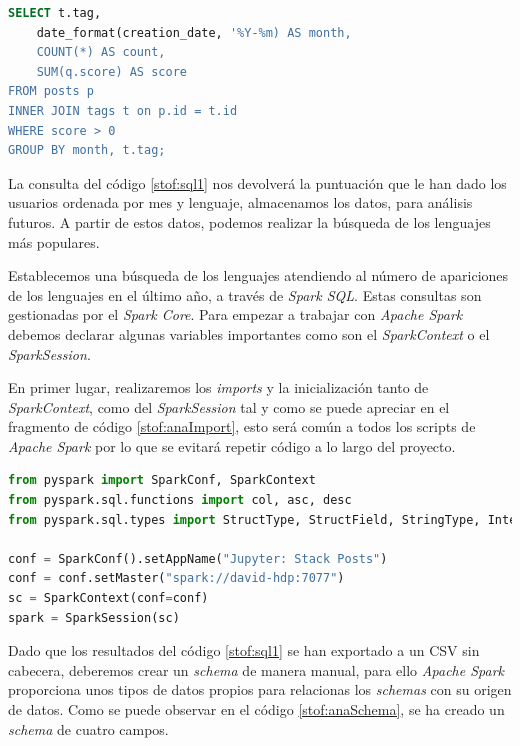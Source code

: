 \begin{lstlisting}[label=stof:sql1,language=sql,frame=single,caption={Consulta \gls{SQL} para la extraccion de la fecha, \textit{tag} y \textit{score} de las consultas en \textit{Stack Overflow}.}]
SELECT t.tag,
	date_format(creation_date, '%Y-%m) AS month,
	COUNT(*) AS count,
	SUM(q.score) AS score
FROM posts p
INNER JOIN tags t on p.id = t.id
WHERE score > 0
GROUP BY month, t.tag;
\end{lstlisting}

La consulta del código \ref{stof:sql1} nos devolverá la puntuación que le han dado los usuarios ordenada por mes y lenguaje, almacenamos los datos, para análisis futuros. A partir de estos datos, podemos realizar la búsqueda de los lenguajes más populares.

Establecemos una búsqueda de los lenguajes atendiendo al número de apariciones de los lenguajes en el último año, a través de \textit{Spark SQL}.
Estas consultas son gestionadas por el \textit{Spark Core}. Para empezar a trabajar con \textit{Apache Spark} debemos declarar algunas variables importantes como son el \textit{SparkContext} o el \textit{SparkSession}.

En primer lugar, realizaremos los \textit{imports} y la inicialización tanto de \textit{SparkContext}, como del \textit{SparkSession} tal y como se puede apreciar en el fragmento de código \ref{stof:anaImport}, esto será común a todos los scripts de \textit{Apache Spark} por lo que se evitará repetir código a lo largo del proyecto.

\begin{lstlisting}[label=stof:anaImport,language=Python,frame=single,caption=\textit{Imports} y configuración de una sessión de \textit{Apache Spark}.]
from pyspark import SparkConf, SparkContext
from pyspark.sql.functions import col, asc, desc
from pyspark.sql.types import StructType, StructField, StringType, IntegerType

conf = SparkConf().setAppName("Jupyter: Stack Posts")
conf = conf.setMaster("spark://david-hdp:7077")
sc = SparkContext(conf=conf)
spark = SparkSession(sc)
\end{lstlisting}

Dado que los resultados del código \ref{stof:sql1} se han exportado a un \gls{CSV} sin cabecera, deberemos crear un \textit{schema} de manera manual, para ello \textit{Apache Spark} proporciona unos tipos de datos propios para relacionas los \textit{schemas} con su origen de datos. Como se puede observar en el código \ref{stof:anaSchema}, se ha creado un \textit{schema} de cuatro campos.

